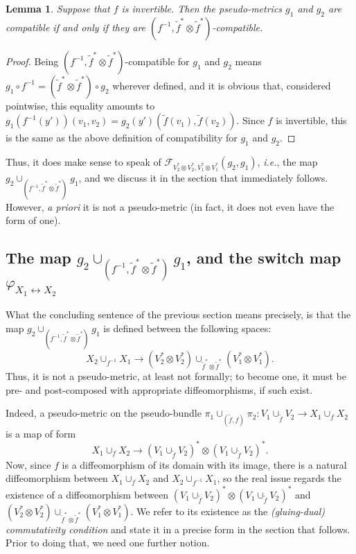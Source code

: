 \documentclass{article}
\newtheorem{lemma}{Lemma}[section]
\begin{document}
\begin{lemma}
Suppose that $f$ is invertible. Then the pseudo-metrics $g_1$ and $g_2$ are compatible if and only if they are $(f^{-1},\tilde{f}^*\otimes\tilde{f}^*)$-compatible.
\end{lemma}

\begin{proof}
Being $(f^{-1},\tilde{f}^*\otimes\tilde{f}^*)$-compatible for $g_1$ and $g_2$ means $g_1\circ f^{-1}=(\tilde{f}^*\otimes\tilde{f}^*)\circ g_2$ wherever defined, and it is obvious that, considered pointwise, this 
equality amounts to $g_1(f^{-1}(y'))(v_1,v_2)=g_2(y')(\tilde{f}(v_1),\tilde{f}(v_2))$. Since $f$ is invertible, this is the same as the above definition of compatibility for $g_1$ and $g_2$.
\end{proof}

Thus, it does make sense to speak of $\mathcal{F}_{V_2^*\otimes V_2^*,V_1^*\otimes V_1^*}(g_2,g_1)$, \emph{i.e.}, the map $g_2\cup_{(f^{-1},\tilde{f}^*\otimes\tilde{f}^*)}g_1$, and we discuss it in the section 
that immediately follows. However, \emph{a priori} it is not a pseudo-metric (in fact, it does not even have the form of one).


\subsection{The map $g_2\cup_{(f^{-1},\tilde{f}^*\otimes\tilde{f}^*)}g_1$, and the switch map $\varphi_{X_1\leftrightarrow X_2}$}

What the concluding sentence of the previous section means precisely, is that the map $g_2\cup_{(f^{-1},\tilde{f}^*\otimes\tilde{f}^*)}g_1$ is defined  between the following spaces:
$$X_2\cup_{f^{-1}}X_1\to(V_2^*\otimes V_2^*)\cup_{\tilde{f}^*\otimes\tilde{f}^*}(V_1^*\otimes V_1^*).$$ Thus, it is not a pseudo-metric, at least not formally; to become one, it must be pre- and post-composed 
with appropriate diffeomorphisms, if such exist.

Indeed, a pseudo-metric on the pseudo-bundle $\pi_1\cup_{(\tilde{f},f)}\pi_2:V_1\cup_{\tilde{f}}V_2\to X_1\cup_f X_2$ is a map of form
$$X_1\cup_f X_2\to(V_1\cup_{\tilde{f}}V_2)^*\otimes(V_1\cup_{\tilde{f}}V_2)^*.$$ Now, since $f$ is a diffeomorphism of its domain with its image, there is a natural diffeomorphism between $X_1\cup_f X_2$ 
and $X_2\cup_{f^{-1}}X_1$, so the real issue regards the existence of a diffeomorphism between $(V_1\cup_{\tilde{f}}V_2)^*\otimes(V_1\cup_{\tilde{f}}V_2)^*$ and
$(V_2^*\otimes V_2^*)\cup_{\tilde{f}^*\otimes\tilde{f}^*}(V_1^*\otimes V_1^*)$. We refer to its existence as the \emph{(gluing-dual) commutativity condition} and state it in a precise form in the section that 
follows. Prior to doing that, we need one further notion.
\end{document}
